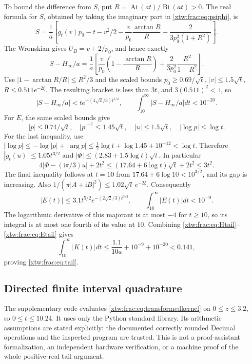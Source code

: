 \documentclass[11pt]{article}
\theoremstyle{remark}\newtheorem{remark}[theorem]{Remark}
\newcommand{\Ai}{\operatorname{Ai}}
\newcommand{\Bi}{\operatorname{Bi}}
\newcommand{\ii}{\mathrm i}
\begin{document}
To bound the difference from $S$, put $R=\Ai(at)/\Bi(at)>0$.
The real formula for $S$, obtained by taking the imaginary part in
\eqref{xtw:frac:eq:psiphi}, is
\begin{equation}\label{xtw:frac:eq:realS}
 S=\frac1a\left[g_t(v)p_0-t-v^2/2
       -\frac v{p_0}\frac{\arctan R}{R}
       -\frac2{3p_0^2(1+R^2)}\right].
\end{equation}
The Wronskian gives $U_B=v+2/p_0$, and hence exactly
\[
 S-H_\infty/a=\frac1a\left[
 \frac v{p_0}\left(1-\frac{\arctan R}{R}\right)
                  +\frac2{3p_0^2}\frac{R^2}{1+R^2}\right].
\]
Use $|1-\arctan R/R|\le R^2/3$ and the scaled bounds
$p_0\ge0.69/\sqrt t$, $|v|\le1.5\sqrt t$,
$R\le0.511e^{-2\xi}$. The resulting bracket is less than $3t$,
and $3(0.511)^2<1$, so
\begin{equation}\label{xtw:frac:eq:Stail}
 |S-H_\infty/a|<t e^{-(4\sqrt2/3)t^{3/2}},
 \qquad\int_{10}^\infty|S-H_\infty/a|dt<10^{-20}.
\end{equation}
For $E$, the same scaled bounds give
\[
 |p|\le0.74/\sqrt t,\quad |p|^{-1}\le1.45\sqrt t,\quad
 |u|\le1.5\sqrt t,\quad |\log p|\le\log t.
\]
For the last inequality, use
$|\log p|\le-\log|p|+|\arg p|
\le\frac12\log t+\log1.45+10^{-12}<\log t$.
Therefore $|g_t(u)|\le1.05t^{3/2}$ and
$|\Phi|\le(2.83+1.5\log t)\sqrt t$. In particular
\[
 4|\Phi-(\ii\pi/3)u|+2t^2
 \le(17.64+6\log t)\sqrt t+2t^2\le3t^2.
\]
The final inequality follows at $t=10$ from
$17.64+6\log10<10^{3/2}$, and its gap is increasing.
Also $1/(\pi|A+\ii B|^2)\le1.02\sqrt t\,e^{-2\xi}$.
Consequently
\begin{equation}\label{xtw:frac:eq:Etail}
 |E(t)|\le3.1t^{5/2}e^{-(2\sqrt2/3)t^{3/2}},
 \qquad\int_{10}^\infty|E(t)|dt<10^{-9}.
\end{equation}
The logarithmic derivative of this majorant is at most $-4$ for $t\ge10$,
so its integral is at most one fourth of its value at $10$.
Combining \eqref{xtw:frac:eq:Htail}--\eqref{xtw:frac:eq:Etail} gives
\[
 \int_{10}^\infty|K(t)|dt
 \le\frac{1.1}{10a}+10^{-9}+10^{-20}<0.141,
\]
proving \eqref{xtw:frac:eq:tail}.

\subsection{Directed finite interval quadrature}
The supplementary code evaluates \eqref{xtw:frac:eq:transformedkernel} on
$0\le z\le3.2$, so $0\le t\le10.24$. It uses only the Python standard
library. Its arithmetic assumptions are stated explicitly: the documented
correctly rounded Decimal operations \cite{decimal} and the inspected
program are trusted. This is not a proof-assistant formalization, an
independent hardware verification, or a machine proof of the whole
positive-real tail argument.
\end{document}
